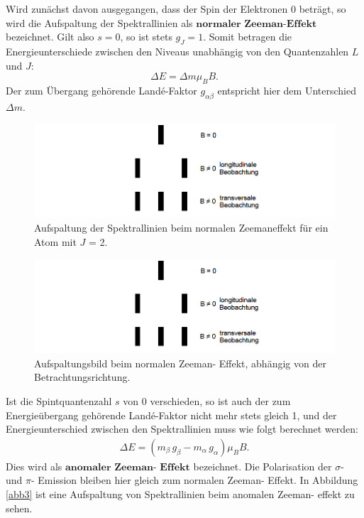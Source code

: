 \noindent Wird zunächst davon ausgegangen, dass der Spin der Elektronen 0 beträgt, so
wird die Aufspaltung der Spektrallinien als $\textbf{normaler Zeeman-Effekt}$ bezeichnet.
Gilt also $s=0$, so ist stets $g_J=1$. Somit betragen die Energieunterschiede zwischen
den Niveaus unabhängig von den Quantenzahlen $L$ und $J$:
\begin{equation}
	\Delta E = \Delta m \mu_{B} B.
\end{equation}
Der zum Übergang gehörende Landé-Faktor $g_{\alpha \beta}$ entspricht hier dem Unterschied
$\Delta m$.
\FloatBarrier
\begin{figure}
  \centering
  \includegraphics[scale=0.5]{normal2.PNG}
  \caption{Aufspaltung der Spektrallinien beim normalen Zeemaneffekt für ein Atom mit $J$ = 2. \cite{Q1}}
  \label{abb1}
\end{figure}
\FloatBarrier

\FloatBarrier
\begin{figure}
  \centering
  \includegraphics[scale=0.5]{normal2.PNG}
  \caption{Aufspaltungsbild beim normalen Zeeman- Effekt, abhängig von der Betrachtungsrichtung. \cite{Q1}}
  \label{abb2}
\end{figure}
\FloatBarrier

Ist die Spintquantenzahl $s$ von 0 verschieden, so ist auch der zum Energieübergang gehörende
Landé-Faktor nicht mehr stets gleich 1, und der Energieunterschied zwischen den Spektrallinien
muss wie folgt berechnet werden:
\begin{align*}
    \Delta E = (m_{\beta} \, g_{\beta} - m_{\alpha} \, g_{\alpha} )\mu_{B} B.
\end{align*}
Dies wird als $\textbf{anomaler Zeeman- Effekt}$ bezeichnet.
Die Polarisation der $\sigma$- und $\pi$- Emission bleiben hier gleich zum normalen
Zeeman- Effekt.
In Abbildung \ref{abb3} ist eine Aufspaltung von Spektrallinien beim anomalen Zeeman- effekt zu sehen.

